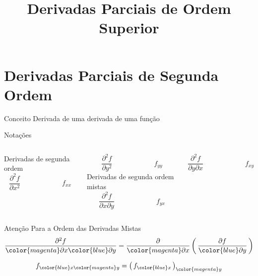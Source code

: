 
\usepackage{calculo_varias_variaveis-1}

\title{Derivadas Parciais de Ordem Superior}



\addtitle

\section{Derivadas Parciais de Segunda Ordem}

\begin{frame}{Conceito}
  Derivada de uma derivada de uma função
\end{frame}

\begin{frame}{Notações}
\begin{columns}
  Derivadas de segunda ordem
  \[
    \frac{\partial^2 f}{\partial x^2} \qquad\qquad\qquad
    f_{xx}
  \]

  \vspace{\baselineskip}
  \[
    \frac{\partial^2 f}{\partial y^2} \qquad\qquad\qquad
    f_{yy}
  \]
  \pause
  Derivadas de segunda ordem mistas
  \[
    \frac{\partial^2 f}{\partial x \partial y} \qquad\qquad\qquad
    f_{yx}
  \]

  \vspace{\baselineskip}
  \[
    \frac{\partial^2 f}{\partial y \partial x} \qquad\qquad\qquad
    f_{xy}
  \]
\end{columns}
\end{frame}

\begin{frame}{Atenção Para a Ordem das Derivadas Mistas}
  \[
    \frac{\partial^2 f}{{\color{magenta} \partial x} {\color{blue} \partial y}}
    = \frac{\partial}{{\color{magenta} \partial x}}
      \left(\,\frac{\partial f}{{\color{blue} \partial y}}\,\right)
  \]

  \vspace{\baselineskip}
  \[
    f_{{\color{blue} x}{\color{magenta} y}} = \big(\,f_{\color{blue} x}\,\big)_{\color{magenta} y}
  \]
\end{frame}

